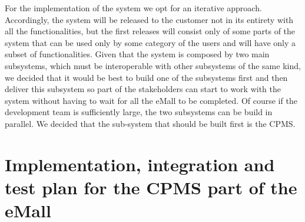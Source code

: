 For the implementation of the system we opt for an iterative approach. Accordingly, the system will be released to the customer not in its entirety with all the functionalities, but the first releases will consist only of some parts of the system that can be used only by some category of the users and will have only a subset of functionalities. Given that the system is composed by two main subsystems, which must be interoperable with other subsystems of the same kind, we decided that it would be best to build one of the subsystems first and then deliver this subsystem so part of the stakeholders can start to work with the system without having to wait for all the eMall to be completed. Of course if the development team is sufficiently large, the two subsystems can be build in parallel. We decided that the sub-system that should be built first is the CPMS.

\section{Implementation, integration and test plan for the CPMS part of the eMall}
